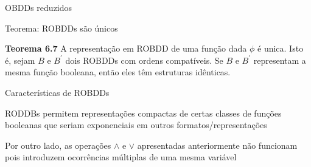 \expandafter\documentclass\expandafter[table, usenames, svgnames, dvipsnames,14pt, \classopts]{beamer}
\begin{document}
\begin{frame}{OBDDs reduzidos}

    \begin{center}
    \end{center}            

\end{frame}

\begin{frame}{Teorema: ROBDDs são únicos}

    \begin{block}{\textbf{Teorema 6.7}}
        A representação em ROBDD de uma função dada $\phi$ é unica. Isto é, sejam $B$ e $B^\prime$ dois ROBDDs com ordens compatíveis. Se $B$ e $B^\prime$ representam a mesma função booleana, então eles têm estruturas idênticas.
    \end{block}

\end{frame}

\begin{frame}{Características de ROBDDs}

    \begin{outline}
        \1 RODDBs permitem representações compactas de certas classes de funções booleanas
            \2[-] que seriam exponenciais em outros formatos/representações
            
        \vspace{1em}
        
        \1 Por outro lado, as operações $\land$ e $\lor$ apresentadas anteriormente não funcionam
            \2[-] pois introduzem ocorrências múltiplas de uma mesma variável
    \end{outline}

\end{frame}
\end{document}
